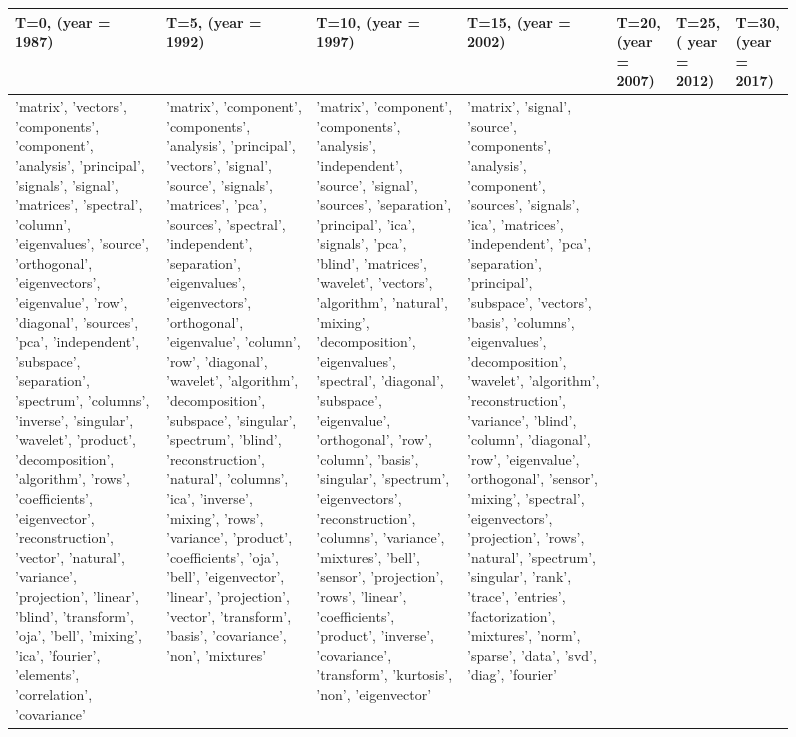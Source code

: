 \begin{figure}[t]
\begin{center}
\tiny
\begin{tabular}{|p{1.8cm}|p{1.8cm}|p{1.8cm}|p{1.8cm}|p{1.8cm}|p{1.8cm}|p{1.8cm}|}
\hline \bf T=0, (year = 1987) & \bf T=5, (year = 1992) & \bf T=10, (year = 1997) & \bf T=15, (year = 2002) & \bf T=20, (year = 2007) & \bf T=25, ( year = 2012) & \bf T=30, (year = 2017) \\ \hline

'matrix', 'vectors', 'components', 'component', 'analysis', 'principal', 'signals', 'signal', 'matrices', 'spectral', 'column', 'eigenvalues', 'source', 'orthogonal', 'eigenvectors', 'eigenvalue', 'row', 'diagonal', 'sources', 'pca', 'independent', 'subspace', 'separation', 'spectrum', 'columns', 'inverse', 'singular', 'wavelet', 'product', 'decomposition', 'algorithm', 'rows', 'coefficients', 'eigenvector', 'reconstruction', 'vector', 'natural', 'variance', 'projection', 'linear', 'blind', 'transform', 'oja', 'bell', 'mixing', 'ica', 'fourier', 'elements', 'correlation', 'covariance'
&
'matrix', 'component', 'components', 'analysis', 'principal', 'vectors', 'signal', 'source', 'signals', 'matrices', 'pca', 'sources', 'spectral', 'independent', 'separation', 'eigenvalues', 'eigenvectors', 'orthogonal', 'eigenvalue', 'column', 'row', 'diagonal', 'wavelet', 'algorithm', 'decomposition', 'subspace', 'singular', 'spectrum', 'blind', 'reconstruction', 'natural', 'columns', 'ica', 'inverse', 'mixing', 'rows', 'variance', 'product', 'coefficients', 'oja', 'bell', 'eigenvector', 'linear', 'projection', 'vector', 'transform', 'basis', 'covariance', 'non', 'mixtures'
&
'matrix', 'component', 'components', 'analysis', 'independent', 'source', 'signal', 'sources', 'separation', 'principal', 'ica', 'signals', 'pca', 'blind', 'matrices', 'wavelet', 'vectors', 'algorithm', 'natural', 'mixing', 'decomposition', 'eigenvalues', 'spectral', 'diagonal', 'subspace', 'eigenvalue', 'orthogonal', 'row', 'column', 'basis', 'singular', 'spectrum', 'eigenvectors', 'reconstruction', 'columns', 'variance', 'mixtures', 'bell', 'sensor', 'projection', 'rows', 'linear', 'coefficients', 'product', 'inverse', 'covariance', 'transform', 'kurtosis', 'non', 'eigenvector'
&
'matrix', 'signal', 'source', 'components', 'analysis', 'component', 'sources', 'signals', 'ica', 'matrices', 'independent', 'pca', 'separation', 'principal', 'subspace', 'vectors', 'basis', 'columns', 'eigenvalues', 'decomposition', 'wavelet', 'algorithm', 'reconstruction', 'variance', 'blind', 'column', 'diagonal', 'row', 'eigenvalue', 'orthogonal', 'sensor', 'mixing', 'spectral', 'eigenvectors', 'projection', 'rows', 'natural', 'spectrum', 'singular', 'rank', 'trace', 'entries', 'factorization', 'mixtures', 'norm', 'sparse', 'data', 'svd', 'diag', 'fourier'

\end{tabular}
\end{center}
\end{figure}
